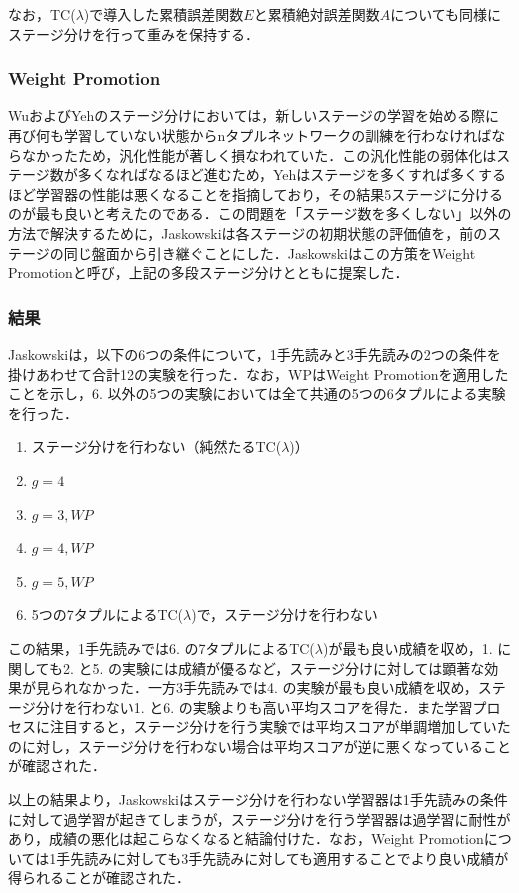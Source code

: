 \documentclass{suribt}
\begin{document}
なお，TC(${\lambda}$)で導入した累積誤差関数$E$と累積絶対誤差関数$A$についても同様にステージ分けを行って重みを保持する．

\subsubsection{Weight Promotion}
WuおよびYehのステージ分けにおいては，新しいステージの学習を始める際に再び何も学習していない状態からnタプルネットワークの訓練を行わなければならなかったため，汎化性能が著しく損なわれていた．この汎化性能の弱体化はステージ数が多くなればなるほど進むため，Yehはステージを多くすれば多くするほど学習器の性能は悪くなることを指摘しており，その結果5ステージに分けるのが最も良いと考えたのである．この問題を「ステージ数を多くしない」以外の方法で解決するために，Jaskowskiは各ステージの初期状態の評価値を，前のステージの同じ盤面から引き継ぐことにした．Jaskowskiはこの方策をWeight Promotionと呼び，上記の多段ステージ分けとともに提案した．

\subsubsection{結果}
Jaskowskiは，以下の6つの条件について，1手先読みと3手先読みの2つの条件を掛けあわせて合計12の実験を行った．なお，WPはWeight Promotionを適用したことを示し，6. 以外の5つの実験においては全て共通の5つの6タプルによる実験を行った．

\begin{enumerate}
\item ステージ分けを行わない（純然たるTC(${\lambda}$)）
\item $g=4$
\item $g=3, WP$
\item $g=4, WP$
\item $g=5, WP$
\item 5つの7タプルによるTC(${\lambda}$)で，ステージ分けを行わない
\end{enumerate}

この結果，1手先読みでは6. の7タプルによるTC(${\lambda}$)が最も良い成績を収め，1. に関しても2. と5. の実験には成績が優るなど，ステージ分けに対しては顕著な効果が見られなかった．一方3手先読みでは4. の実験が最も良い成績を収め，ステージ分けを行わない1. と6. の実験よりも高い平均スコアを得た．また学習プロセスに注目すると，ステージ分けを行う実験では平均スコアが単調増加していたのに対し，ステージ分けを行わない場合は平均スコアが逆に悪くなっていることが確認された．

以上の結果より，Jaskowskiはステージ分けを行わない学習器は1手先読みの条件に対して過学習が起きてしまうが，ステージ分けを行う学習器は過学習に耐性があり，成績の悪化は起こらなくなると結論付けた．なお，Weight Promotionについては1手先読みに対しても3手先読みに対しても適用することでより良い成績が得られることが確認された．
\end{document}
